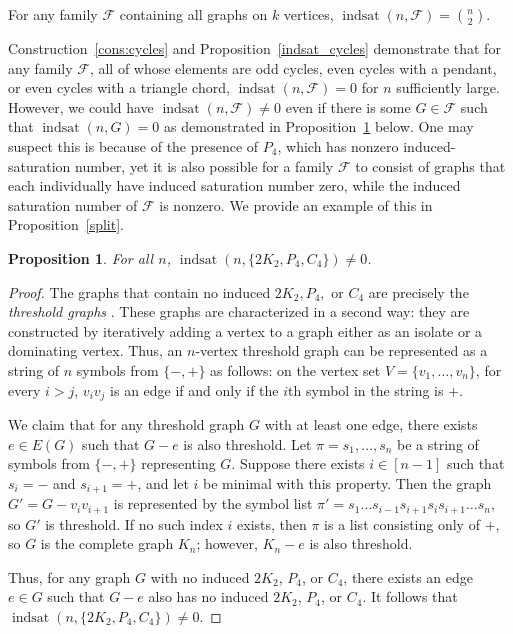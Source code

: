 \documentclass[12pt]{amsart}
\theoremstyle{plain}
\newtheorem{prop}[thm]{Proposition}
\theoremstyle{definition}
\theoremstyle{remark}
\newcommand{\indsat}[2]{\ensuremath{\operatorname{indsat}(#1,#2)}\xspace}
\begin{document}
For any family $\mathcal F$ containing all graphs on $k$ vertices,
 $\indsat{n}{\mathcal F}={n \choose 2}$.

Construction~\ref{cons:cycles} and Proposition~\ref{indsat_cycles} demonstrate that for any family $\mathcal F$, all of whose elements are odd cycles, even cycles with a pendant, or even cycles with a triangle chord, $\indsat{n}{\mathcal F}=0$ for $n$ sufficiently large.
However, we could have $\indsat{n}{\mathcal{F}}\neq 0$ even if there is some $G\in \mathcal{F}$ such that $\indsat{n}{G}=0$
as demonstrated in Proposition~\ref{threshold} below.
One may suspect this is because of the presence of $P_4$, which has nonzero induced-saturation number, yet
it is also possible for a family $\mathcal F$ to consist of graphs that each individually have induced saturation number zero, while the induced saturation number of $\mathcal F$ is nonzero. We provide an example of this in Proposition~\ref{split}.

\begin{prop}\label{threshold}
For all $n$, $\indsat{n}{\{2K_2,P_4,C_4\}} \neq 0$.
\end{prop}
\begin{proof}
The graphs that contain no induced $2K_2,P_4,$ or $C_4$ are precisely the \emph{threshold graphs} \cite{CH}. These graphs are characterized in a second way: they are constructed by iteratively adding a vertex to a graph either as an isolate or a dominating vertex. Thus, an $n$-vertex threshold graph can be represented as a string of $n$ symbols from $\{-,+\}$ as follows:
on the vertex set $V=\{v_1,\ldots,v_n\}$, for every $i>j$, $v_iv_j$ is an edge if and only if the $i$th symbol in the string is $+$.

We claim that for any threshold graph $G$ with at least one edge, there exists $e \in E(G)$ such that $G-e$ is also threshold. Let $\pi=s_1, \ldots, s_n$ be a string of symbols from $\{-,+\}$ representing $G$. Suppose there exists $i \in [n-1]$ such that $s_i=-$ and $s_{i+1}=+$, and let $i$ be minimal with this property. Then the graph $G'=G-v_iv_{i+1}$ is represented by the symbol list
$\pi'=s_1 \ldots s_{i-1}s_{i+1}s_is_{i+1}\ldots s_n$, so $G'$ is threshold.
If no such index $i$ exists, then $\pi$ is a list consisting only of $+$, so $G$ is the complete graph $K_n$; however, $K_n-e$ is also threshold.

Thus, for any graph $G$ with no induced $2K_2$, $P_4$, or $C_4$, there exists an edge $e \in G$ such that $G-e$ also has no induced $2K_2$, $P_4$, or $C_4$.
It follows that $\indsat{n}{\{2K_2,P_4,C_4\}} \neq 0$.
\end{proof}
\end{document}
